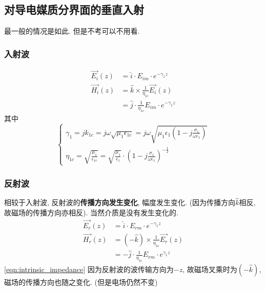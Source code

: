 \documentclass[a4paper]{report}
\begin{document}
\subsection{对导电媒质分界面的垂直入射}
最一般的情况是如此. 但是不考可以不用看. 
\subsubsection{入射波}
\begin{align*}
    \vec{E _i}(z)&=\hat{i}\cdot E_{im}\cdot e^{-\gamma_1 z}\\
    \vec{H _i}(z)&=\hat{k}\times \frac{1}{\eta_{1c}}\vec{E_i}(z) \\
    &=\hat{j}\cdot \frac{1}{\eta_{1c}} E_{im}\cdot e^{-\gamma_1 z}
\end{align*}
其中$$\begin{cases}
    \gamma_1=jk_{1c}=j\omega\sqrt{\mu_1 \epsilon_{1c}}=j\omega\sqrt{\mu_1\epsilon_1(1-j\frac{\sigma_1}{\omega\epsilon_1})}\\
    \eta_{1c}=\sqrt{\frac{\mu_1}{\epsilon_{1c}}}=\sqrt{\frac{\mu_1}{\epsilon_1}}\cdot (1-j\frac{\sigma_1}{\omega\epsilon_1})^{-\frac{1}{2}}
\end{cases}
\label{eqn:intrinsic_impedance}
$$
\subsubsection{反射波}
相较于入射波, 反射波的\textbf{传播方向发生变化}, 幅度发生变化. (因为传播方向$\hat{k}$相反, 故磁场的传播方向亦相反). 当然介质是没有发生变化的. 
\begin{align*}
    \vec{E _r}(z)&=\hat{i}\cdot E_{rm}\cdot e^{-\gamma_1 z}\\
    \vec{H _r}(z)&=(-\hat{k})\times \frac{1}{\eta_{1c}}\vec{E_r}(z) \\
    &=-\hat{j}\cdot \frac{1}{\eta_{1c}} E_{rm}\cdot e^{\gamma_1 z}
\end{align*}
\ref{eqn:intrinsic_impedance}
因为反射波的波传输方向为$-z$, 故磁场叉乘时为$(-\hat{k})$, 磁场的传播方向也随之变化. (但是电场仍然不变)
\end{document}
